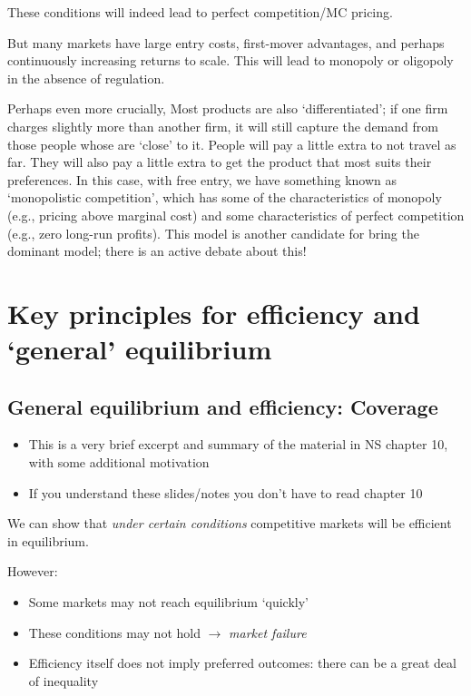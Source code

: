 \documentclass[]{article}
\providecommand{\tightlist}{%
  \setlength{\itemsep}{0pt}\setlength{\parskip}{0pt}}
\begin{document}
These conditions will indeed lead to perfect competition/MC pricing.

But many markets have large entry costs, first-mover advantages, and
perhaps continuously increasing returns to scale. This will lead to
monopoly or oligopoly in the absence of regulation.

Perhaps even more crucially, Most products are also `differentiated'; if
one firm charges slightly more than another firm, it will still capture
the demand from those people whose are `close' to it. People will pay a
little extra to not travel as far. They will also pay a little extra to
get the product that most suits their preferences. In this case, with
free entry, we have something known as `monopolistic competition', which
has some of the characteristics of monopoly (e.g., pricing above
marginal cost) and some characteristics of perfect competition (e.g.,
zero long-run profits). This model is another candidate for bring the
dominant model; there is an active debate about this!

\bigskip

\hypertarget{key-principles-for-efficiency-and-general-equilibrium}{%
\section{Key principles for efficiency and `general'
equilibrium}\label{key-principles-for-efficiency-and-general-equilibrium}}

\hypertarget{general-equilibrium-and-efficiency-coverage}{%
\subsection{General equilibrium and efficiency:
Coverage}\label{general-equilibrium-and-efficiency-coverage}}

\begin{itemize}
\tightlist
\item
  This is a very brief excerpt and summary of the material in NS chapter
  10, with some additional motivation
\item
  If you understand these slides/notes you don't have to read chapter 10
\end{itemize}

We can show that \emph{under certain conditions} competitive markets
will be efficient in equilibrium.

However:

\begin{itemize}
\item
  Some markets may not reach equilibrium `quickly'
\item
  These conditions may not hold \(\rightarrow\) \emph{market failure}
\item
  Efficiency itself does not imply preferred outcomes: there can be a
  great deal of inequality
\end{itemize}
\end{document}
